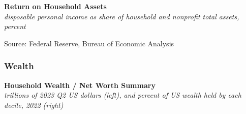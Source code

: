 \documentclass{report}
\makeatletter
\newcommand{\tbllink}[1]{\href{https://raw.githubusercontent.com/bdecon/US-chartbook/master/chartbook/data/#1}{\faTable}}
\newcommand*\short[1]{\expandafter\@gobbletwo\number\numexpr#1\relax}
\newcommand{\dateaxisticks}{
		date coordinates in=x, axis line style={draw=none},
		xmax={2024-01-31},
		max space between ticks=40,	    
		xtick={{1990-01-01}, {1992-01-01}, {1994-01-01}, 
			{1996-01-01}, {1998-01-01}, {2000-01-01}, 
			{2002-01-01}, {2004-01-01}, {2006-01-01},
			{2008-01-01}, {2010-01-01}, {2012-01-01}, {2014-01-01},
		    {2016-01-01}, {2018-01-01}, {2020-01-01}, {2022-01-01}, 
		    {2024-01-01}, {2026-01-01}},
		minor xtick={{1989-01-01}, {1991-01-01}, {1993-01-01},
			{1995-01-01}, {1997-01-01}, {1999-01-01}, 
			{2001-01-01}, {2003-01-01}, {2005-01-01}, {2007-01-01},
		    {2009-01-01}, {2011-01-01}, {2013-01-01}, {2015-01-01},
		    {2017-01-01}, {2019-01-01}, {2021-01-01}, {2023-01-01}, 
		    {2025-01-01}, {2027-01-01}},
		enlarge y limits={0.06}, enlarge x limits={0.01},
		xticklabel style={align=center, yshift=-2pt}, tick label style={inner sep=0pt},
		}
\newcommand{\bbar}[2]{extra #1 ticks = {{#2}}, extra #1 tick labels = ,
		extra #1 tick style = {grid=major, grid style={thick, black!25}},}
\newcommand{\stdline}[4]{\addplot[very thick, no markers, color=#1] 
		table [x=#2, y=#3, col sep=comma] {#4};	}
\newcommand{\rbars}{
		\fill[color=black!10] (axis cs:{1990-07-01},\pgfkeysvalueof{/pgfplots/ymin})
			rectangle (axis cs:{1991-03-01}, \pgfkeysvalueof{/pgfplots/ymax});
		\fill[color=black!10] (axis cs:{2007-12-01},\pgfkeysvalueof{/pgfplots/ymin})
			rectangle (axis cs:{2009-07-01}, \pgfkeysvalueof{/pgfplots/ymax});
		\fill[color=black!10] (axis cs:{2001-03-01},\pgfkeysvalueof{/pgfplots/ymin})
			rectangle (axis cs:{2001-11-01}, \pgfkeysvalueof{/pgfplots/ymax});
		\fill[color=black!10] (axis cs:{2020-02-01},\pgfkeysvalueof{/pgfplots/ymin})
			rectangle (axis cs:{2020-05-01}, \pgfkeysvalueof{/pgfplots/ymax});}
\makeatother
\begin{document}
{\begin{minipage}{1.0\textwidth}
\normalsize \textbf{Return on Household Assets}\\
\footnotesize{\textit{disposable personal income as share of household and nonprofit total assets, percent}}
\vspace{3.3cm}

\hspace{2mm} 

\footnotesize{Source: Federal Reserve, Bureau of Economic Analysis} \hfill \tbllink{dpish.csv}
\end{minipage}
\newpage
\vspace{-10mm}

\begin{minipage}{1.0\textwidth}   
\subsubsection*{Wealth}
\small  
\vspace{1mm}

\normalsize \textbf{Household Wealth / Net Worth Summary}\\
\footnotesize{\textit{trillions of 2023 Q2 US dollars (left), and percent of US wealth held by each decile, 2022 (right)}}
\end{minipage}
\vspace*{-2mm}

}
\end{document}
